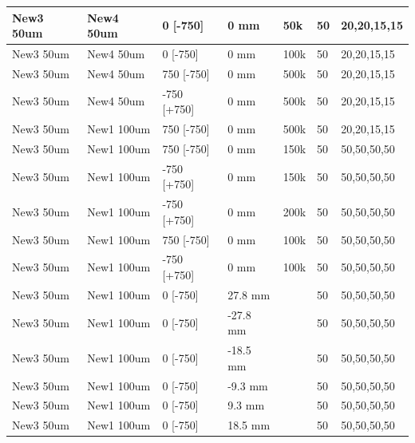 \begin{refsection}
\begin{table}
\begin{tabular}{|l|l|l|l|l|l|l|}
            New3 50um   & New4 50um   & 0 {[}-750{]}     & 0 mm     & 50k    & 50            & 20,20,15,15       \\ \hline
            New3 50um   & New4 50um   & 0 {[}-750{]}     & 0 mm     & 100k   & 50            & 20,20,15,15       \\ \hline
            New3 50um   & New4 50um   & 750 {[}-750{]}   & 0 mm     & 500k   & 50            & 20,20,15,15       \\ \hline
            New3 50um   & New4 50um   & -750 {[}+750{]}  & 0 mm     & 500k   & 50            & 20,20,15,15       \\ \hline
            New3 50um   & New1 100um  & 750 {[}-750{]}   & 0 mm     & 500k   & 50            & 20,20,15,15       \\ \hline
            New3 50um   & New1 100um  & 750 {[}-750{]}   & 0 mm     & 150k   & 50            & 50,50,50,50       \\ \hline
            New3 50um   & New1 100um  & -750 {[}+750{]}  & 0 mm     & 150k   & 50            & 50,50,50,50       \\ \hline
            New3 50um   & New1 100um  & -750 {[}+750{]}  & 0 mm     & 200k   & 50            & 50,50,50,50       \\ \hline
            New3 50um   & New1 100um  & 750 {[}-750{]}   & 0 mm     & 100k   & 50            & 50,50,50,50       \\ \hline
            New3 50um   & New1 100um  & -750 {[}+750{]}  & 0 mm     & 100k   & 50            & 50,50,50,50       \\ \hline
            New3 50um   & New1 100um  & 0 {[}-750{]}     & 27.8 mm  &        & 50            & 50,50,50,50       \\ \hline
            New3 50um   & New1 100um  & 0 {[}-750{]}     & -27.8 mm &        & 50            & 50,50,50,50       \\ \hline
            New3 50um   & New1 100um  & 0 {[}-750{]}     & -18.5 mm &        & 50            & 50,50,50,50       \\ \hline
            New3 50um   & New1 100um  & 0 {[}-750{]}     & -9.3 mm  &        & 50            & 50,50,50,50       \\ \hline
            New3 50um   & New1 100um  & 0 {[}-750{]}     & 9.3 mm   &        & 50            & 50,50,50,50       \\ \hline
            New3 50um   & New1 100um  & 0 {[}-750{]}     & 18.5 mm  &        & 50            & 50,50,50,50       \\ \hline

\end{tabular}
\end{table}
\end{refsection}
